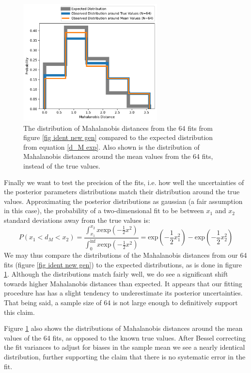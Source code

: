 \documentclass{report}
\begin{document}
\begin{figure}[h]
  \centering
  \includegraphics[width=0.65\textwidth]{Images/Pure_Simulation/d_M_distribution.pdf}
  \caption{The distribution of Mahalanobis distances from the 64 fits from figure \ref{fig ident new gen} compared to the expected distribution from equation \ref{d_M exp}. Also shown is the distribution of Mahalanobis distances around the mean values from the 64 fits, instead of the true values.}
  \label{fig d_M distribution}
\end{figure}


Finally we want to test the precision of the fits, i.e. how well the uncertainties of the posterior parameters distributions match their distribution around the true values. Approximating the posterior distributions as gaussian (a fair assumption in this case), the probability of a two-dimensional fit to be between $x_1$ and $x_2$ standard deviations away from the true values is:
\begin{equation} \label{d_M exp}
  P(x_1<d_M<x_2) = \frac{\int_{x_1}^{x_2}x \text{exp}(-\frac{1}{2}x^2)}{\int_{0}^{\inf}x \text{exp}(-\frac{1}{2}x^2)} = \text{exp}(-\frac{1}{2}x_1^2) - \text{exp}(-\frac{1}{2}x_2^2)
\end{equation}
We may thus compare the distributions of the Mahalanobis distances from our 64 fits (figure \ref{fig ident new gen}) to the expected distributions, as is done in figure \ref{fig d_M distribution}. Although the distributions match fairly well, we do see a significant shift towards higher Mahalanobis distances than expected. It appears that our fitting procedure has has a slight tendency to underestimate its posterior uncertainties. That being said, a sample size of 64 is not large enough to definitively support this claim.

Figure \ref{fig d_M distribution} also shows the distributions of Mahalanobis distances around the mean values of the 64 fits, as opposed to the known true values. After Bessel correcting the fit variances to adjust for biases in the sample mean we see a nearly identical distribution, further supporting the claim that there is no systematic error in the fit. 
\end{document}
